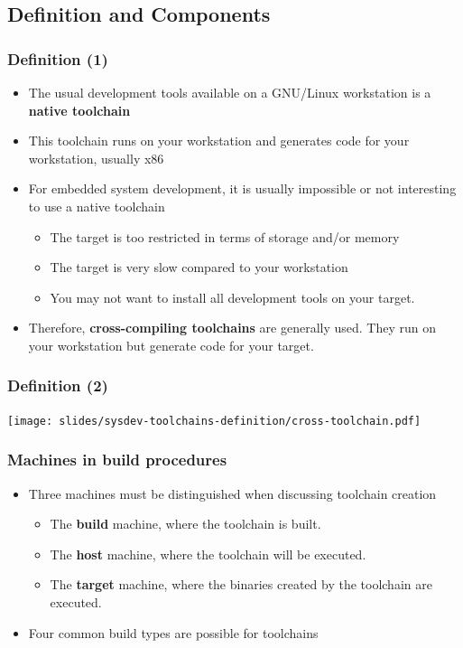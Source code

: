 \subsection{Definition and Components}
\begin{frame}
  \frametitle{Definition (1)}
  \begin{itemize}
  \item The usual development tools available on a GNU/Linux
    workstation is a {\bf native toolchain}
  \item This toolchain runs on your workstation and generates code for
    your workstation, usually x86
  \item For embedded system development, it is usually impossible or not
    interesting to use a native toolchain
    \begin{itemize}
    \item The target is too restricted in terms of storage and/or memory
    \item The target is very slow compared to your workstation
    \item You may not want to install all development tools on your target.
    \end{itemize}
  \item Therefore, {\bf cross-compiling toolchains} are generally
    used. They run on your workstation but generate code for your
    target.
  \end{itemize}
\end{frame}

\begin{frame}
  \frametitle{Definition (2)}
  \begin{center}
    \texttt{[image: slides/sysdev-toolchains-definition/cross-toolchain.pdf]}
  \end{center}
\end{frame}

\begin{frame}
  \frametitle{Machines in build procedures}
  \begin{itemize}
  \item Three machines must be distinguished when discussing toolchain creation
    \begin{itemize}
    \item The {\bf build} machine, where the toolchain is built.
    \item The {\bf host} machine, where the toolchain will be executed.
    \item The {\bf target} machine, where the binaries created by the
      toolchain are executed.
    \end{itemize}
  \item Four common build types are possible for toolchains
  \end{itemize}
\end{frame}

